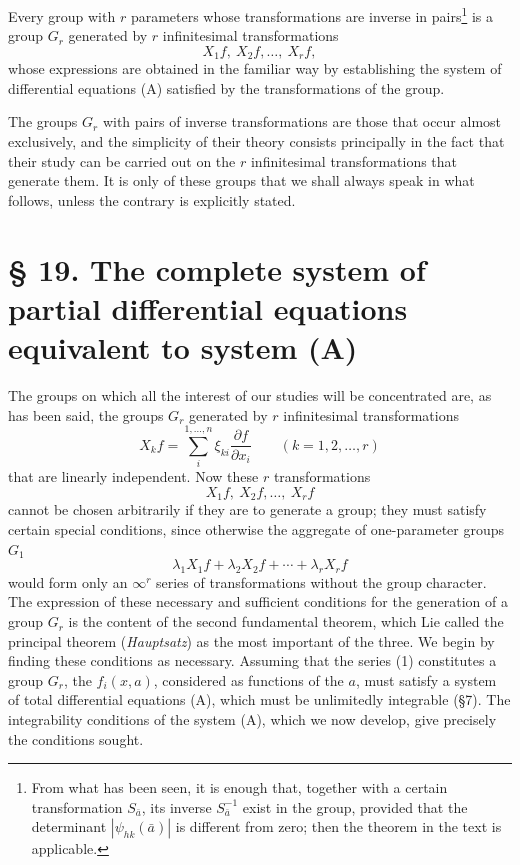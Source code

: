 \documentclass[11pt]{book}
\begin{document}
Every group with $r$ parameters whose transformations are inverse in pairs\footnote{From what has been seen, it is enough that, together with a certain transformation $S_{\bar a}$, its inverse $S_{\bar a}^{-1}$ exist in the group, provided that the determinant $|\psi_{hk}(\bar a)|$ is different from zero; then the theorem in the text is applicable.} is a group $G_r$ generated by $r$ infinitesimal transformations
\[
 X_1f,\ X_2f,\ldots,\ X_rf,
\]
whose expressions are obtained in the familiar way by establishing the system of differential equations (A) satisfied by the transformations of the group.

The groups $G_r$ with pairs of inverse transformations are those that occur almost exclusively, and the simplicity of their theory consists principally in the fact that their study can be carried out on the $r$ infinitesimal transformations that generate them. It is only of these groups that we shall always speak in what follows, unless the contrary is explicitly stated.

\section*{\S{} 19. The complete system of partial differential equations equivalent to system (A)}

The groups on which all the interest of our studies will be concentrated are, as has been said, the groups $G_r$ generated by $r$ infinitesimal transformations
\[
 X_kf=\sum\limits_i^{1,\ldots,n}\xi_{ki}\frac{\partial f}{\partial x_i}\qquad (k=1,2,\ldots,r)
\]
that are linearly independent. Now these $r$ transformations
\[
 X_1f,\ X_2f,\ldots,\ X_rf
\]
cannot be chosen arbitrarily if they are to generate a group; they must satisfy certain special conditions, since otherwise the aggregate of one-parameter groups $G_1$
\[
 \lambda_1X_1f+\lambda_2X_2f+\cdots+\lambda_rX_rf
\]
would form only an $\infty^r$ series of transformations without the group character. The expression of these necessary and sufficient conditions for the generation of a group $G_r$ is the content of the second fundamental theorem, which Lie called the principal theorem (\emph{Hauptsatz}) as the most important of the three. We begin by finding these conditions as necessary. Assuming that the series (1) constitutes a group $G_r$, the $f_i(x,a)$, considered as functions of the $a$, must satisfy a system of total differential equations (A), which must be unlimitedly integrable (\S{}7). The integrability conditions of the system (A), which we now develop, give precisely the conditions sought.
\end{document}
